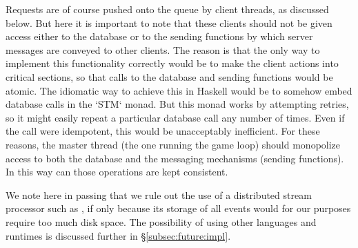Requests are of course pushed onto the queue by client threads, as discussed
below.
But here it is important to note that these clients should not be given
access either to the database or to the sending functions by which server
messages are conveyed to other clients.
The reason is that the only way to implement this functionality correctly
would be to make the client actions into critical sections, so that calls to
the database and sending functions would be atomic.
The idiomatic way to achieve this in Haskell
would be to somehow embed database calls in the `STM` monad.
But this monad works by attempting retries, so it might easily repeat a
particular database call any number of times.
Even if the call were idempotent, this would be unacceptably inefficient.
For these reasons, the master thread (the one running the game loop) should
monopolize access to both the database and the messaging mechanisms (sending
functions).
In this way can those operations are kept consistent.

We note here in passing that we rule out the use of a distributed stream
processor such as ,
if only because its storage of all events would
for our purposes require too much disk space.
The possibility of using other languages and runtimes is discussed further
in \S\ref{subsec:future:impl}.
